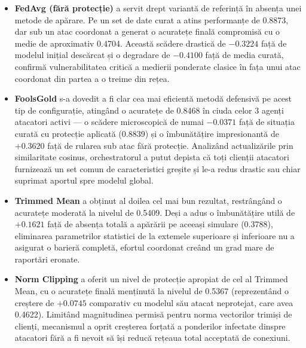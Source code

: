 \documentclass[../../main.tex]{subfiles}
\begin{document}
        \begin{itemize}
            \item \textbf{FedAvg (fără protecție)} a servit drept variantă de referință în absența unei metode de apărare. Pe un set de date curat a atins performanțe de 0.8873, dar sub un atac coordonat a generat o acuratețe finală compromisă cu o medie de aproximativ 0.4704. Această scădere drastică de $-0.3224$ față de modelul inițial descărcat și o degradare de $-0.4100$ față de media curată, confirmă vulnerabilitatea critică a medierii ponderate clasice în fața unui atac coordonat din partea a o treime din rețea.
            \item \textbf{FoolsGold} s-a dovedit a fi clar cea mai eficientă metodă defensivă pe acest tip de configurație, atingând o acuratețe de 0.8468 în ciuda celor 3 agenți atacatori activi --- o scădere microscopică de numai $-0.0371$ față de situația curată cu protecție aplicată (0.8839) și o îmbunătățire impresionantă de $+0.3620$ față de rularea sub atac fără protecție. Analizând actualizările prin similaritate cosinus, orchestratorul a putut depista că toți clienții atacatori furnizează un set comun de caracteristici greșite și le-a redus drastic sau chiar suprimat aportul spre modelul global.
            \item \textbf{Trimmed Mean} a obținut al doilea cel mai bun rezultat, restrângând o acuratețe moderată la nivelul de 0.5409. Deși a adus o îmbunătățire utilă de $+0.1621$ față de absența totală a apărării pe aceeași simulare (0.3788), eliminarea parametrilor statistici de la extemele superioare și inferioare nu a asigurat o barieră completă, efortul coordonat creând un grad mare de raportări eronate.
            \item \textbf{Norm Clipping} a oferit un nivel de protecție apropiat de cel al Trimmed Mean, cu o acuratețe finală menținută la nivelul de 0.5367 (reprezentând o creștere de $+0.0745$ comparativ cu modelul său atacat neprotejat, care avea 0.4622). Limitând magnitudinea permisă pentru norma vectorilor trimiși de clienți, mecanismul a oprit creșterea forțată a ponderilor infectate dinspre atacatori fără a fi nevoit să își reducă rețeaua total acceptată de conexiuni.

\end{itemize}
\end{document}
